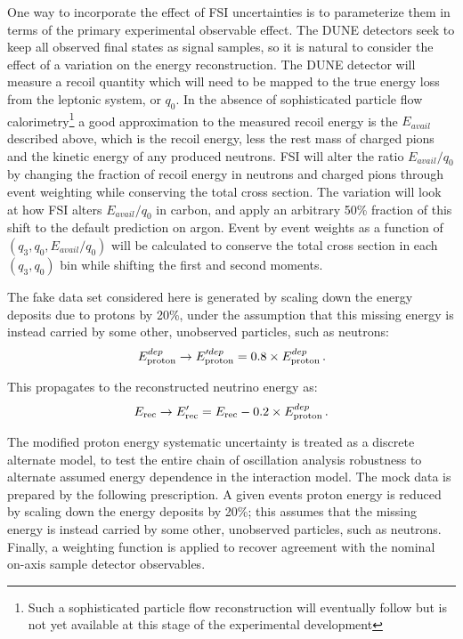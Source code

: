 One way to incorporate the effect of FSI uncertainties is to parameterize them in terms of the primary experimental observable effect. The DUNE detectors seek to keep all observed final states as signal samples, so it is natural to consider the effect of a variation on the energy reconstruction.  The DUNE detector will measure a recoil quantity which will need to be mapped to the true energy loss from the leptonic system, or $q_0$.  In the absence of sophisticated particle flow calorimetry\footnote{Such a sophisticated particle flow reconstruction will eventually follow but is not yet available at this stage of the experimental development} a good approximation to the measured recoil energy is the $E_{avail}$ described above, which is the recoil energy, less the rest mass of charged pions and the kinetic energy of any produced neutrons.  FSI will alter the ratio $E_{avail}/q_0$ by changing the fraction of recoil energy in neutrons and charged pions through event weighting while conserving the total cross section.
The variation will look at how FSI alters $E_{avail}/q_0$ in carbon, and apply an arbitrary 50\% fraction of this shift to the default prediction on argon.  Event by event weights as a function of $(q_3,q_0,E_{avail}/q_0)$ will be calculated to conserve the total cross section in each $(q_3,q_0)$ bin while shifting the first and second moments.

The fake data set considered here is generated by scaling down the energy deposits due to protons by 20\%, under the assumption that this missing energy is instead carried by some other, unobserved particles, such as neutrons:
\begin{equation}
E_{\rm proton}^{dep} \rightarrow E_{\rm proton}^{\prime dep} = 0.8 \times E_{\rm proton}^{dep} \, .
\end{equation}

This propagates to the reconstructed neutrino energy as:
\begin{equation}
E_{\rm rec} \rightarrow E_{\rm rec}^{\prime} = E_{\rm rec} - 0.2 \times E_{\rm proton}^{dep} \, .
\end{equation}

The modified proton energy systematic uncertainty is treated as a discrete alternate model, to test the entire chain of oscillation analysis robustness to alternate assumed energy dependence in the interaction model. The mock data is prepared by the following prescription. A given events proton energy is reduced by scaling down the energy deposits by 20\%; this assumes that the missing energy is instead carried by some other, unobserved particles, such as neutrons. Finally, a weighting function is applied to recover agreement with the nominal on-axis sample detector observables.


